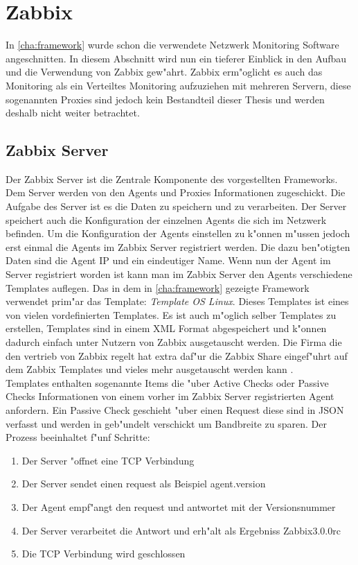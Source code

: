 \chapter{Zabbix}
\label{cha:zabbix}
In \cref{cha:framework} wurde schon die verwendete Netzwerk Monitoring Software angeschnitten. In diesem Abschnitt wird nun %
ein tieferer Einblick in den Aufbau und die Verwendung von Zabbix gew"ahrt. Zabbix erm"oglicht es %
auch das Monitoring als ein Verteiltes Monitoring aufzuziehen mit mehreren Servern, diese sogenannten Proxies %
sind jedoch kein Bestandteil dieser Thesis und werden deshalb nicht weiter betrachtet.

\section{Zabbix Server}
\label{sec:server}
Der Zabbix Server ist die Zentrale Komponente des vorgestellten Frameworks. Dem Server werden von den Agents und Proxies %
Informationen zugeschickt. Die Aufgabe des Server ist es die Daten zu speichern und zu verarbeiten. %
Der Server speichert auch die Konfiguration der einzelnen Agents die sich im Netzwerk befinden. %
Um die Konfiguration der Agents einstellen zu k"onnen m"ussen jedoch erst einmal die Agents im Zabbix %
Server registriert werden. Die dazu ben"otigten Daten sind die Agent IP und ein eindeutiger Name. %
Wenn nun der Agent im Server registriert worden ist kann man im Zabbix Server den Agents verschiedene Templates auflegen. %
Das in dem in \cref{cha:framework} gezeigte Framework verwendet prim"ar das Template: \emph{Template OS %
Linux}. Dieses Templates ist eines von vielen vordefinierten Templates. Es ist auch m"oglich selber Templates %
zu erstellen, Templates sind in einem XML Format abgespeichert und k"onnen dadurch einfach unter Nutzern von Zabbix %
ausgetauscht werden. Die Firma die den vertrieb von Zabbix regelt hat extra daf"ur die Zabbix Share eingef"uhrt %
auf dem Zabbix Templates und vieles mehr ausgetauscht werden kann \autocite{zabbix:share}. \ \\ %
Templates enthalten sogenannte Items die "uber Active Checks oder Passive Checks Informationen von %
einem vorher im Zabbix Server registrierten Agent anfordern. Ein Passive Check geschieht "uber einen %
Request diese sind in JSON verfasst und werden in geb"undelt verschickt um Bandbreite zu sparen. %
Der Prozess beeinhaltet f"unf Schritte: %
\begin{enumerate}
\item Der Server "offnet eine TCP Verbindung %
\item Der Server sendet einen request als Beispiel agent.version %
\item Der Agent empf"angt den request und antwortet mit der Versionsnummer %
\item Der Server verarbeitet die Antwort und erh"alt als Ergebniss Zabbix3.0.0rc %
\item Die TCP Verbindung wird geschlossen %
\end{enumerate}
